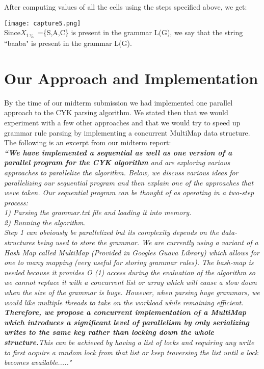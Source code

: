 \documentclass[12pt]{article}
\begin{document}
  
After computing values of all the cells using the steps specified above, we get:


\texttt{[image: capture5.png]}\\

Since$ X_1,_5$ =\{S,A,C\} is present in the grammar L(G), we say that the string ``baaba" is present in the grammar L(G).

\section{Our Approach and Implementation}
 By the time of our midterm submission we had implemented one parallel approach to the CYK parsing algorithm. We stated then that we would experiment with a few other approaches and that we would try to speed up grammar rule parsing by implementing a concurrent MultiMap data structure. \\
 
 
 The following is an excerpt from our midterm report: \\	
 
 \vspace{2 mm}
\textit{
\footnotesize{	
\textbf{\textit{``We have implemented a sequential as well as one version of a parallel program for the CYK algorithm }}and are exploring various approaches to parallelize the algorithm. Below, we discuss various ideas for parallelizing our sequential program and then explain one of the approaches that we\textsc{}ve taken. Our sequential program can be thought of as operating in a two-step process: \\
1)	Parsing the grammar.txt file and loading it into memory.\\
2)	Running the algorithm. \\
Step 1 can obviously be parallelized but it\textsc{}s complexity depends on the data-structures being used to store the grammar. We are currently using a variant of a Hash Map called MultiMap (Provided in Google\textsc{}s Guava Library) which allows for one to many mapping (very useful for storing grammar rules). The hash-map is needed because it provides O (1) access during the evaluation of the algorithm so we cannot replace it with a concurrent list or array which will cause a slow down when the size of the grammar is huge. However, when parsing huge grammars, we would like multiple threads to take on the workload while remaining efficient.\textbf{\textit{ Therefore, we propose a concurrent implementation of a MultiMap which introduces a significant level of parallelism by only serializing writes to the same key rather than locking down the whole structure.}}This can be achieved by having a list of locks and requiring any write to first acquire a random lock from that list or keep traversing the list until a lock becomes available....."
}
}
\end{document}
